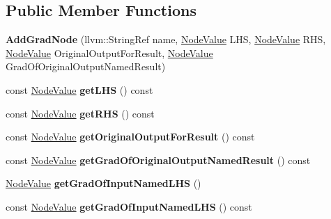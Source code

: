 \subsection*{Public Member Functions}
\begin{DoxyCompactItemize}
\item 
\mbox{\label{classglow_1_1_add_grad_node_a42a45004a307d232ebb25c4d19d35d00}} 
{\bfseries Add\+Grad\+Node} (llvm\+::\+String\+Ref name, \hyperlink{structglow_1_1_node_value}{Node\+Value} L\+HS, \hyperlink{structglow_1_1_node_value}{Node\+Value} R\+HS, \hyperlink{structglow_1_1_node_value}{Node\+Value} Original\+Output\+For\+Result, \hyperlink{structglow_1_1_node_value}{Node\+Value} Grad\+Of\+Original\+Output\+Named\+Result)
\item 
\mbox{\label{classglow_1_1_add_grad_node_af03dd60e09806f3daacd4f187f832e36}} 
const \hyperlink{structglow_1_1_node_value}{Node\+Value} {\bfseries get\+L\+HS} () const
\item 
\mbox{\label{classglow_1_1_add_grad_node_ad67ba7cf46d526e799cd56681fd192d7}} 
const \hyperlink{structglow_1_1_node_value}{Node\+Value} {\bfseries get\+R\+HS} () const
\item 
\mbox{\label{classglow_1_1_add_grad_node_a14a77dabcea1ce2686689baf0da71848}} 
const \hyperlink{structglow_1_1_node_value}{Node\+Value} {\bfseries get\+Original\+Output\+For\+Result} () const
\item 
\mbox{\label{classglow_1_1_add_grad_node_a1fca841019e6f48cd17c7b07974f6da5}} 
const \hyperlink{structglow_1_1_node_value}{Node\+Value} {\bfseries get\+Grad\+Of\+Original\+Output\+Named\+Result} () const
\item 
\mbox{\label{classglow_1_1_add_grad_node_a9531e9d3f81518553232ba838a1f5820}} 
\hyperlink{structglow_1_1_node_value}{Node\+Value} {\bfseries get\+Grad\+Of\+Input\+Named\+L\+HS} ()
\item 
\mbox{\label{classglow_1_1_add_grad_node_ab9c1825a55cc61628dec3b0de60fd36a}} 
const \hyperlink{structglow_1_1_node_value}{Node\+Value} {\bfseries get\+Grad\+Of\+Input\+Named\+L\+HS} () const

\end{DoxyCompactItemize}
